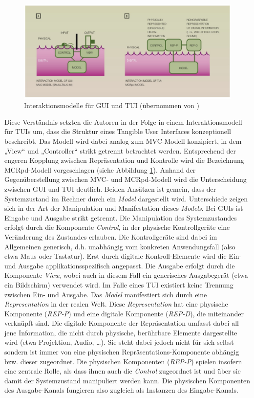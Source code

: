 \begin{figure}[htbp]
	\centering
		\includegraphics[width=12cm]{img/ImplementierungUeberblick/MCRpd.jpg}
	\caption[Interaktionsmodelle für GUI und TUI]{Interaktionsmodelle für GUI und TUI (übernommen von \citet{Ullmer00})}
	\label{fig:img_ImplementierungUeberblick_MCRpd}
\end{figure}

Diese Verständnis setzten die Autoren in der Folge in einem Interaktionsmodell für \glspl{TUI} um, dass die Struktur eines Tangible User Interfaces konzeptionell beschreibt. Das Modell wird dabei analog zum \gls{MVC}-Modell konzipiert, in dem „View“ und „Controller“ strikt getrennt betrachtet werden. Entsprechend der engeren Kopplung zwischen Repräsentation und Kontrolle wird die Bezeichnung \gls{MCRpd}-Modell vorgeschlagen (siehe Abbildung \ref{fig:img_ImplementierungUeberblick_MCRpd}). Anhand der Gegenüberstellung zwischen \gls{MVC}- und \gls{MCRpd}-Modell wird die Unterscheidung zwischen \gls{GUI} und \gls{TUI} deutlich. Beiden Ansätzen ist gemein, dass der Systemzustand im Rechner durch ein \emph{Model} dargestellt wird. Unterschiede zeigen sich in der Art der Manipulation und Manifestation dieses \emph{Models}. Bei \glspl{GUI} ist Eingabe und Ausgabe strikt getrennt. Die Manipulation des Systemzustandes erfolgt durch die Komponente \emph{Control}, in der physische Kontrollgeräte eine Veränderung des Zustandes erlauben. Die Kontrollgeräte sind dabei im Allgemeinen generisch, d.h. unabhängig vom konkreten Anwendungsfall (also etwa Maus oder Tastatur). Erst durch digitale Kontroll-Elemente wird die Ein- und Ausgabe applikationsspezifisch angepasst. Die Ausgabe erfolgt durch die Komponente \emph{View}, wobei auch in diesem Fall ein generisches Ausgabegerät (etwa ein Bildschirm) verwendet wird. Im Falle eines \gls{TUI} existiert keine Trennung zwischen Ein- und Ausgabe. Das \emph{Model} manifestiert sich durch eine \emph{Representation} in der realen Welt. Diese \emph{Representation} hat eine physische Komponente (\emph{REP-P}) und eine digitale Komponente (\emph{REP-D}), die miteinander verknüpft sind. Die digitale Komponente der Repräsentation umfasst dabei all jene Information, die nicht durch physische, berührbare Elemente dargestellte wird (etwa Projektion, Audio, \ldots). Sie steht dabei jedoch nicht für sich selbst sondern ist immer von eine physischen Repräsentations-Komponente abhängig bzw. dieser zugeordnet. Die physischen Komponenten (\emph{REP-P}) spielen insofern eine zentrale Rolle, als dass ihnen auch die \emph{Control} zugeordnet ist und über sie damit der Systemzustand manipuliert werden kann. Die physischen Komponenten des Ausgabe-Kanals fungieren also zugleich als Instanzen des Eingabe-Kanals.

